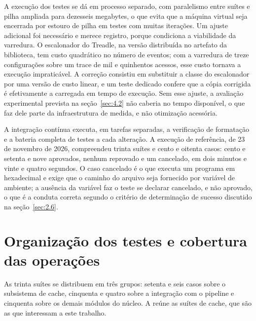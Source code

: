 A execução dos testes se dá em processo separado, com paralelismo entre suítes e pilha ampliada para dezesseis megabytes, o que evita que a máquina virtual seja encerrada por estouro de pilha em testes com muitas iterações. Um ajuste adicional foi necessário e merece registro, porque condiciona a viabilidade da varredura. O escalonador do Treadle, na versão distribuída no artefato da biblioteca, tem custo quadrático no número de eventos; com a varredura de treze configurações sobre um trace de mil e quinhentos acessos, esse custo tornava a execução impraticável. A correção consistiu em substituir a classe do escalonador por uma versão de custo linear, e um teste dedicado confere que a cópia corrigida é efetivamente a carregada em tempo de execução. Sem esse ajuste, a avaliação experimental prevista na seção~\ref{sec:4.2} não caberia no tempo disponível, o que faz dele parte da infraestrutura de medida, e não otimização acessória.

A integração contínua executa, em tarefas separadas, a verificação de formatação e a bateria completa de testes a cada alteração. A execução de referência, de 23 de novembro de 2026, compreendeu trinta suítes e cento e oitenta casos: cento e setenta e nove aprovados, nenhum reprovado e um cancelado, em dois minutos e vinte e quatro segundos. O caso cancelado é o que executa um programa em hexadecimal e exige que o caminho do arquivo seja fornecido por variável de ambiente; a ausência da variável faz o teste se declarar cancelado, e não aprovado, o que é a conduta correta segundo o critério de determinação de sucesso discutido na seção~\ref{sec:2.6}.

\section{Organização dos testes e cobertura das operações}\label{sec:6.2}

As trinta suítes se distribuem em três grupos: setenta e seis casos sobre o subsistema de cache, cinquenta e quatro sobre a integração com o pipeline e cinquenta sobre os demais módulos do núcleo. A  reúne as suítes de cache, que são as que interessam a este trabalho.

